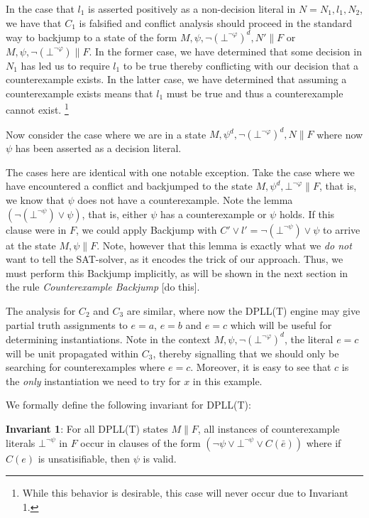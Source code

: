 \documentclass{llncs}
\begin{document}
In the case that $l_1$ is asserted positively as a non-decision literal in $N = N_1, l_1, N_2$, we have that $C_1$ is falsified and conflict analysis should proceed in the standard way to backjump to a state of the form $M, \psi, \neg( \bot^{\neg \varphi} )^d, N' \parallel F$ or $M, \psi, \neg( \bot^{\neg \varphi} )  \parallel F$.
In the former case, we have determined that some decision in $N_1$ has led us to require $l_1$ to be true thereby conflicting with our decision that a counterexample exists.
In the latter case, we have determined that assuming a counterexample exists means that $l_1$ must be true and thus a counterexample cannot exist.
\footnote{ While this behavior is desirable, this case will never occur due to Invariant 1.}

Now consider the case where we are in a state $M, \psi^d, \neg( \bot^{\neg \varphi} )^d, N  \parallel F$ where now $\psi$ has been asserted as a decision literal.

The cases here are identical with one notable exception.
Take the case where we have encountered a conflict and backjumped to the state $M, \psi^d, \bot^{\neg \varphi} \parallel F$, that is, we know that $\psi$ does not have a counterexample.
Note the lemma $(\neg (\bot^{\neg \psi}) \vee \psi)$, that is, either $\psi$ has a counterexample or $\psi$ holds.
If this clause were in $F$, we could apply Backjump with $C' \vee l' = \neg (\bot^{\neg \psi}) \vee \psi$ to arrive at the state $M, \psi \parallel F$.
Note, however that this lemma is exactly what we \emph{do not} want to tell the SAT-solver, as it encodes the trick of our approach.
Thus, we must perform this Backjump implicitly, as will be shown in the next section in the rule \emph{Counterexample Backjump} [do this].

The analysis for $C_2$ and $C_3$ are similar, where now the DPLL(T) engine may give partial truth assignments to $e = a$, $e = b$ and $e = c$ which will be useful for determining instantiations.
Note in the context $M, \psi, \neg( \bot^{\neg \varphi} )^d$, the literal $e = c$ will be unit propagated within $C_3$, thereby signalling that we should only be searching for counterexamples where $e = c$.
Moreover, it is easy to see that $c$ is the \emph{only} instantiation we need to try for $x$ in this example.

We formally define the following invariant for DPLL(T):

{\bf Invariant 1}:
For all DPLL(T) states $M \parallel F$, all instances of counterexample literals $\bot^{\neg \psi}$ in $F$ occur in clauses of the form $( \neg \psi \vee \bot^{\neg \psi} \vee C(\bar{e}) )$ where if $C(e)$ is unsatisifiable, then $\psi$ is valid. \\
\end{document}
